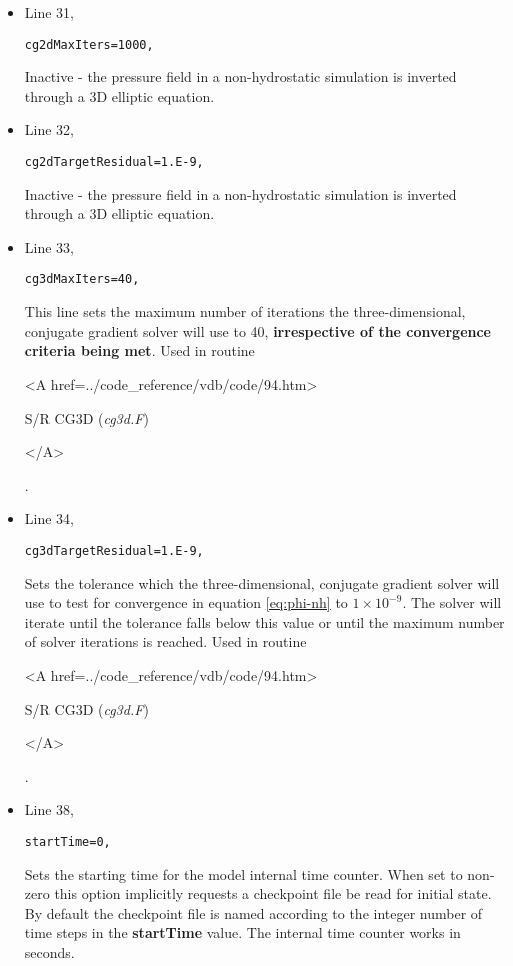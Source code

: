 \begin{itemize}
\item Line 31,
\begin{verbatim}
cg2dMaxIters=1000,
\end{verbatim}
Inactive - the pressure field in a non-hydrostatic simulation is inverted through a 3D
elliptic equation.


\item Line 32,
\begin{verbatim}
cg2dTargetResidual=1.E-9,
\end{verbatim}
Inactive - the pressure field in a non-hydrostatic simulation is inverted through a 3D
elliptic equation.


\item Line 33,
\begin{verbatim}
cg3dMaxIters=40,
\end{verbatim}
This line sets the  maximum number of iterations the three-dimensional, conjugate
gradient solver will use to 40, {\bf irrespective of the convergence 
criteria being met}. Used in routine
{\it
\begin{rawhtml} <A href=../code_reference/vdb/code/94.htm> \end{rawhtml}
S/R CG3D ({\it cg3d.F})
\begin{rawhtml} </A>\end{rawhtml}
}. 



\item Line 34,
\begin{verbatim}
cg3dTargetResidual=1.E-9,
\end{verbatim}
Sets the tolerance which the three-dimensional, conjugate
gradient solver will use to test for convergence in equation 
\ref{eq:phi-nh} %
to $1 \times 10^{-9}$.
The solver will iterate until the tolerance falls below this value 
or until the maximum number of solver iterations is reached. 
Used in routine
{\it
\begin{rawhtml} <A href=../code_reference/vdb/code/94.htm> \end{rawhtml}
S/R CG3D ({\it cg3d.F})
\begin{rawhtml} </A>\end{rawhtml}
}. 


\item Line 38,
\begin{verbatim}
startTime=0,
\end{verbatim}
Sets the starting time for the model internal time counter.
When set to non-zero this option implicitly requests a 
checkpoint file be read for initial state.
By default the checkpoint file is named according to
the integer number of time steps in the {\bf startTime} value.
The internal time counter works in seconds.


\end{itemize}
